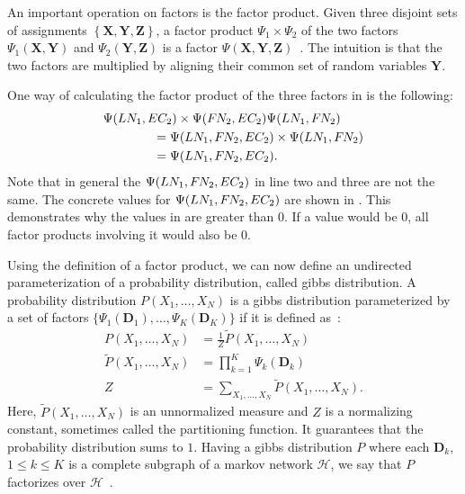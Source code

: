 An important operation on factors is the \gls{factor product}.
Given three disjoint sets of assignments $\left\{\mathbf{X}, \mathbf{Y}, \mathbf{Z}\right\}$, a \gls{factor product} $\Psi_1\times\Psi_2$ of the two factors $\Psi_1(\mathbf{X},\mathbf{Y})$ and $\Psi_2(\mathbf{Y},\mathbf{Z})$ is a factor $\Psi(\mathbf{X},\mathbf{Y},\mathbf{Z})$~\citep{koller2009probabilistic}.
The intuition is that the two factors are multiplied by aligning their common set of \glspl{random variable} $\mathbf{Y}$.

One way of calculating the \gls{factor product} of the three \glspl{factor} in  is the following:
\begin{equation*}
  \begin{split}
  &\Psi(LN_1,EC_2)\times\Psi(F\hspace{-0.07em} N_2,EC_2)\Psi(LN_1,F\hspace{-0.07em} N_2)\\
  &\hspace{4em}=\Psi(LN_1,F\hspace{-0.07em} N_2,EC_2)\times\Psi(LN_1,F\hspace{-0.07em} N_2)\\
  &\hspace{4em}=\Psi(LN_1,F\hspace{-0.07em} N_2,EC_2).
  \end{split}
\end{equation*}
Note that in general the $\Psi(LN_1,F\hspace{-0.07em} N_2,EC_2)$ in line two and three are not the same.
The concrete values for $\Psi(LN_1,F\hspace{-0.07em} N_2,EC_2)$ are shown in .
This demonstrates why the values in  are greater than $0$.
If a value would be $0$, all factor products involving it would also be $0$.

\bigskip

Using the definition of a \gls{factor product}, we can now define an undirected parameterization of a \gls{probability distribution}, called \gls{gibbs distribution}.
A \gls{probability distribution} $P(X_1,\dots,X_N)$ is a \gls{gibbs distribution} parameterized by a set of \glspl{factor} $\{\Psi_1(\mathbf{D}_1),\dots,\Psi_K(\mathbf{D}_K)\}$ if it is defined as~\citep{koller2009probabilistic}:
\begin{equation}
  \label{equ:gibbs-distribution}
  \begin{split}
  P\left(X_1,\dots,X_N\right) & =\frac{1}{Z}\tilde{P}\left(X_1,\dots,X_N\right) \\
  \tilde{P}\left(X_1,\dots,X_N\right) & =\prod_{k=1}^{K}\Psi_k\left(\mathbf{D}_k\right) \\
  Z & =\sum_{X_1,\ldots,X_N}\tilde{P}\left(X_1,\dots,X_N\right).
  \end{split}
\end{equation}
Here, $\tilde{P}(X_1,\dots,X_N)$ is an unnormalized measure and $Z$ is a normalizing constant, sometimes called the \gls{partitioning function}.
It guarantees that the \gls{probability distribution} sums to $1$.
Having a \gls{gibbs distribution} $P$ where each $\mathbf{D}_k$, $1\leq k \leq K$ is a complete subgraph of a \gls{markov network} $\mathcal{H}$, we say that $P$ factorizes over $\mathcal{H}$~\citep{koller2009probabilistic}.

